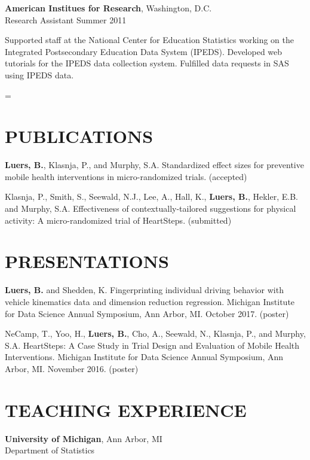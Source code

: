 \documentclass[letterpaper, 11pt]{article}
\newenvironment{absolutelynopagebreak}
  {\par\nobreak\vfil\penalty0\vfilneg
   \vtop\bgroup}
  {\par\xdef\tpd{\the\prevdepth}\egroup
   \prevdepth=\tpd}
\begin{document}
\begin{absolutelynopagebreak}
{\bf American Institues for Research}, Washington, D.C.\\
Research Assistant \hfill Summer 2011

{\addtolength{\leftskip}{15pt}
    Supported staff at the National Center for Education Statistics
   working on the Integrated Postsecondary Education Data System
   (IPEDS).
 Developed web tutorials for the IPEDS data collection
   system.
 Fulfilled data requests in SAS using IPEDS data.


}

\end{absolutelynopagebreak}

\section{PUBLICATIONS}

\textbf{Luers, B.}, Klasnja, P., and Murphy, S.A. Standardized effect sizes for preventive mobile health interventions in micro-randomized trials. (accepted)

Klasnja, P., Smith, S., Seewald, N.J., Lee, A., Hall, K., \textbf{Luers, B.}, Hekler, E.B. and Murphy, S.A. Effectiveness of contextually-tailored suggestions for physical activity: A micro-randomized trial of HeartSteps. (submitted)

\section{PRESENTATIONS}

\textbf{Luers, B.} and Shedden, K. Fingerprinting individual driving behavior with vehicle kinematics data and dimension reduction regression. Michigan Institute for Data Science Annual Symposium, Ann Arbor, MI. October 2017. (poster)

NeCamp, T., Yoo, H., \textbf{Luers, B.}, Cho, A., Seewald, N., Klasnja, P., and Murphy, S.A. HeartSteps: A Case Study in Trial Design and Evaluation of Mobile Health Interventions. Michigan Institute for Data Science Annual Symposium, Ann Arbor, MI. November 2016. (poster)


\section{TEACHING EXPERIENCE}
{\bf University of Michigan}, Ann Arbor, MI \\
Department of Statistics
\end{document}
